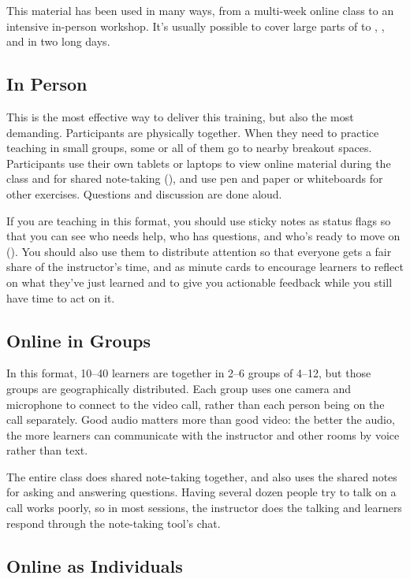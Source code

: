 This material has been used in many ways,
from a multi-week online class to an intensive in-person workshop.
It's usually possible to cover large parts of  to ,
,
and  in two long days.

\subsection*{In Person}

This is the most effective way to deliver this training,
but also the most demanding.
Participants are physically together.
When they need to practice teaching in small groups,
some or all of them go to nearby breakout spaces.
Participants use their own tablets or laptops to view online material during the class
and for shared note-taking (),
and use pen and paper or whiteboards for other exercises.
Questions and discussion are done aloud.

If you are teaching in this format,
you should use sticky notes as status flags
so that you can see who needs help,
who has questions,
and who's ready to move on ().
You should also use them to distribute attention
so that everyone gets a fair share of the instructor's time,
and as minute cards to encourage learners to reflect on what they've just learned
and to give you actionable feedback while you still have time to act on it.

\subsection*{Online in Groups}

In this format,
10--40 learners are together in 2--6 groups of 4--12,
but those groups are geographically distributed.
Each group uses one camera and microphone to connect to the video call,
rather than each person being on the call separately.
Good audio matters more than good video:
the better the audio,
the more learners can communicate with the instructor and other rooms by voice rather than text.

The entire class does shared note-taking together,
and also uses the shared notes for asking and answering questions.
Having several dozen people try to talk on a call works poorly,
so in most sessions,
the instructor does the talking and learners respond through the note-taking tool's chat.

\subsection*{Online as Individuals}

